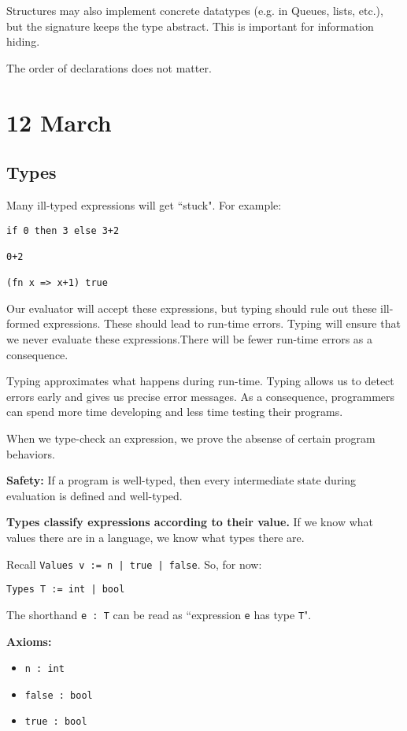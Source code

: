 \documentclass[11pt]{article}
\begin{document}
Structures may also implement concrete datatypes (e.g. in Queues, lists, etc.), but the signature keeps the type abstract. This is important for information hiding.

The order of declarations does not matter.

\section{12 March}
\subsection{Types}

Many ill-typed expressions will get ``stuck". For example:
\begin{verbatim}
if 0 then 3 else 3+2

0+2

(fn x => x+1) true
\end{verbatim}

Our evaluator will accept these expressions, but typing should rule out these ill-formed expressions. These should lead to run-time errors. Typing will ensure that we never evaluate these expressions.There will be fewer run-time errors as a consequence.

Typing approximates what happens during run-time. Typing allows us to detect errors early and gives us precise error messages. As a consequence, programmers can spend more time developing and less time testing their programs. 

When we type-check an expression, we prove the absense of certain program behaviors. 

\textbf{Safety:} If a program is well-typed, then every intermediate state during evaluation is defined and well-typed. 

\textbf{Types classify expressions according to their value.} If we know what values there are in a language, we know what types there are.

Recall \verb~Values v := n | true | false~. So, for now:
\begin{verbatim}
Types T := int | bool
\end{verbatim}

The shorthand \verb~e : T~ can be read as ``expression \verb~e~ has type \verb~T~".

\textbf{Axioms:}
\begin{itemize}
    \item \verb~n : int~
    \item \verb~false : bool~
    \item \verb~true : bool~
\end{itemize}
\end{document}
